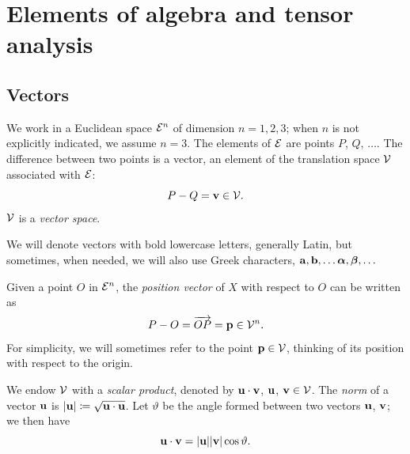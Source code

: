 \setcounter{chapter}{0}
\chapter{Elements of algebra and tensor analysis}

\renewcommand{\thesection}{A.\arabic{section}}
\setcounter{section}{0} %



\renewcommand{\theequation}{A\arabic{equation}}
\setcounter{equation}{0} %

\section{Vectors}  
We work in a Euclidean space $\mathcal{E}^n$ of dimension $n=1,2,3$; when $n$ is not explicitly indicated, we assume $n=3$. The elements of $\mathcal{E}$ are points $P$, $Q$, $\ldots$. The difference between two points is a vector, an element of the translation space $\mathcal{V}$ associated with $\mathcal{E}$:
\begin{equation}
	P-Q=\mathbf{v} \in \mathcal{V}.
\end{equation}
$\mathcal{V}$ is a \textit{vector space}.

We will denote vectors with bold lowercase letters, generally Latin, but sometimes, when needed, we will also use Greek characters, $\mathbf{a}, \mathbf{b}, \ldots \boldsymbol{\alpha}, \boldsymbol{\beta}, \ldots$

Given a point $O$ in $\mathcal{E}^n$, the \textit{position vector} of $X$ with respect to $O$ can be written as
\begin{equation}
	P-O=\overrightarrow{OP}=\mathbf{p}\in \mathcal{V}^n.
\end{equation}
For simplicity, we will sometimes refer to the point $\mathbf{p}\in \mathcal{V}$, thinking of its position with respect to the origin.

We endow $\mathcal{V}$ with a \textit{scalar product}, denoted by $\mathbf{u}\cdot \mathbf{v}$, $\mathbf{u}$, $\mathbf{v}\in\mathcal{V}$.  
The \textit{norm} of a vector $\mathbf{u}$ is $|\mathbf{u}|\coloneqq \sqrt{\mathbf{u}\cdot\mathbf{u}}$. Let $\vartheta$ be the angle formed between two vectors $\mathbf{u}$, $\mathbf{v}$; we then have
\begin{equation}
	\mathbf{u} \cdot \mathbf{v} =|\mathbf{u}||\mathbf{v}|\cos \vartheta.
\end{equation}

